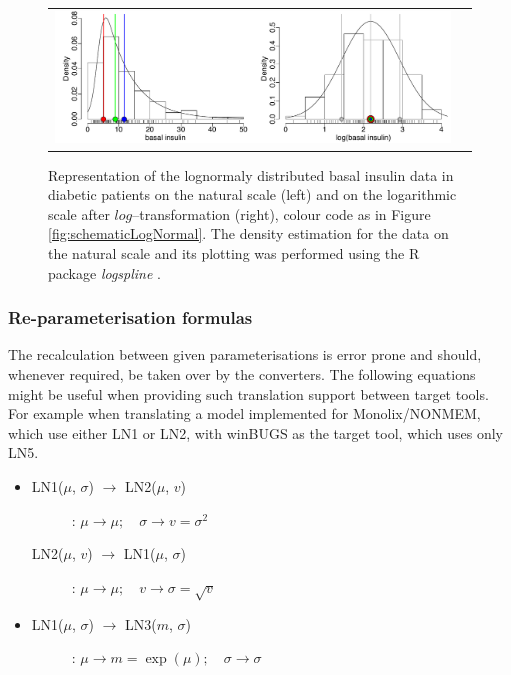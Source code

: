 {\begin{figure}[htb!]
\centering
\begin{tabular}{cc}
 \includegraphics[width=160mm]{pics/normalAndLogDomain}
\end{tabular}
\caption{Representation of the lognormaly distributed basal insulin data in diabetic patients 
\cite{Rudenski:1991aa} on the natural scale (left) and on the logarithmic scale after 
$log$--transformation (right), colour code as in Figure \ref{fig:schematicLogNormal}. 
The density estimation for the data on the natural scale and its plotting was performed 
using the R package \textit{logspline} \cite{Kooperberg:2013}.}
\label{fig:insulinData}
\end{figure}

\subsubsection{Re-parameterisation formulas}
\label{subsubsec:formulas}
The recalculation between given parameterisations is error prone 
and should, whenever required, be taken over by the converters. The 
following equations might be useful when providing such translation support 
between target tools. For example when translating a model implemented 
for Monolix/NONMEM, which use either LN1 or LN2, with winBUGS as the 
target tool, which uses only LN5.\\
\begin{itemize}
\item 
\begin{description}
\item[LN1($\mu$, $\sigma$) $\rightarrow$ LN2($\mu$, $v$)]:
$\mu \rightarrow \mu; \quad \sigma \rightarrow v=\sigma^2$

\item[LN2($\mu$, $v$) $\rightarrow$ LN1($\mu$, $\sigma$)]:
$\mu \rightarrow \mu; \quad v \rightarrow \sigma = \sqrt{v}$
\end{description}

\item 
\begin{description}
\item[LN1($\mu$, $\sigma$) $\rightarrow$ LN3($m$, $\sigma$)]:
$\mu \rightarrow m=\exp(\mu); \quad \sigma \rightarrow \sigma$


\end{description}
\end{itemize}}
